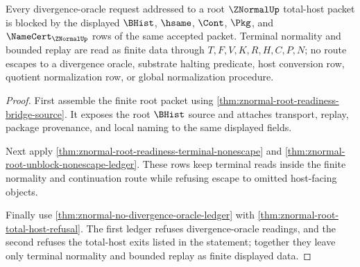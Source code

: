 \begin{theorem}
\label{thm:znormal-divergence-oracle-nonescape-row}
Every divergence-oracle request addressed to a root $\ZNormalUp$ total-host packet is blocked by the displayed $\BHist$, $\hsame$, $\Cont$, $\Pkg$, and $\NameCert_{\ZNormalUp}$ rows of the same accepted packet. Terminal normality and bounded replay are read as finite data through $T,F,V,K,R,H,C,P,N$; no route escapes to a divergence oracle, substrate halting predicate, host conversion row, quotient normalization row, or global normalization procedure.
\end{theorem}
\begin{proof}
First assemble the finite root packet using \autoref{thm:znormal-root-readiness-bridge-source}. It exposes the root $\BHist$ source and attaches transport, replay, package provenance, and local naming to the same displayed fields.

Next apply \autoref{thm:znormal-root-readiness-terminal-nonescape} and \autoref{thm:znormal-root-unblock-nonescape-ledger}. These rows keep terminal reads inside the finite normality and continuation route while refusing escape to omitted host-facing objects.

Finally use \autoref{thm:znormal-no-divergence-oracle-ledger} with \autoref{thm:znormal-root-total-host-refusal}. The first ledger refuses divergence-oracle readings, and the second refuses the total-host exits listed in the statement; together they leave only terminal normality and bounded replay as finite displayed data.
\end{proof}

